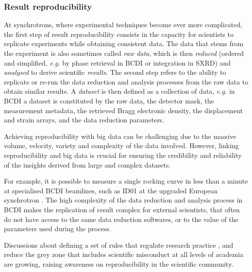 
\subsubsection{Result reproducibility}

At synchrotrons, where experimental techniques become ever more complicated, the first step of result reproducibility consists in the capacity for scientists to replicate experiments while obtaining consistent data.
The data that stems from the experiment is also sometimes called \textit{raw data}, which is then \textit{reduced} (ordered and simplified, \textit{e.g.} by phase retrieval in BCDI or integration in SXRD) and \textit{analysed} to derive scientific \textit{results}.
The second step refers to the ability to replicate or re-run the data reduction and analysis processes from the raw data to obtain similar results.
A \textit{dataset} is then defined as a collection of data, \textit{e.g.} in BCDI a dataset is constituted by the raw data, the detector mask, the measurement metadata, the retrieved Bragg electronic density, the displacement and strain arrays, and the data reduction parameters.

Achieving reproducibility with big data can be challenging due to the massive volume, velocity, variety and complexity of the data involved.
However, linking reproducibility and big data is crucial for ensuring the credibility and reliability of the insights derived from large and complex datasets.

For example, it is possible to measure a single rocking curve in less than a minute at specialised BCDI beamlines, such as ID01 at the upgraded European synchrotron \parencite{Richter2019}.
The high complexity of the data reduction and analysis process in BCDI makes the replication of result complex for external scientists, that often do not have access to the same data reduction softwares, or to the value of the parameters used during the process.

Discussions about defining a set of rules that regulate research practice \parencite{Kretser2019}, and reduce the grey zone that includes scientific misconduct at all levels of academia \parencite{Kornfeld2016} are growing, raising awareness on reproducibility in the scientific community.


